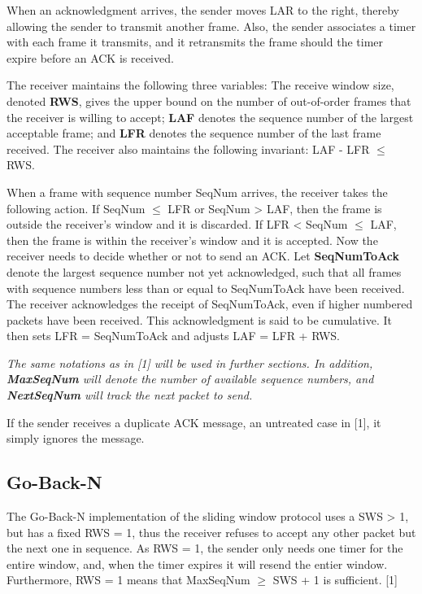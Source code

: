 \documentclass[12pt]{article}
\begin{document}
When an acknowledgment arrives, the sender moves LAR to the right, thereby allowing the sender to transmit another frame. Also, the sender associates a timer with each frame it transmits, and it retransmits the frame should the timer expire before an ACK is received.

The receiver maintains the following three variables: The receive window size, denoted \textbf{RWS}, gives the upper bound on the number of out-of-order frames that the receiver is willing to accept; \textbf{LAF} denotes the sequence number of the largest acceptable frame; and \textbf{LFR} denotes the sequence number of the last frame received. The receiver also maintains the following invariant: LAF - LFR $\leq$ RWS.

When a frame with sequence number SeqNum arrives, the receiver takes the following action. If SeqNum $\leq$ LFR or SeqNum > LAF, then the frame is outside the receiver's window and it is discarded. If LFR < SeqNum $\leq$ LAF, then the frame is within the receiver's window and it is accepted. Now the receiver needs to decide whether or not to send an ACK. Let \textbf{SeqNumToAck} denote the largest sequence number not yet acknowledged, such that all frames with sequence numbers less than or equal to SeqNumToAck have been received. The receiver acknowledges the receipt of SeqNumToAck, even if higher numbered packets have been received. This acknowledgment is said to be cumulative. It then sets LFR = SeqNumToAck and adjusts LAF = LFR + RWS.

\textit{The same notations as in [1] will be used in further sections. In addition, \textbf{MaxSeqNum} will denote the number of available sequence numbers, and \textbf{NextSeqNum} will track the next packet to send.}

If the sender receives a duplicate ACK message, an untreated case in [1],  it simply ignores the message.

\subsection{Go-Back-N}

The Go-Back-N implementation of the sliding window protocol uses a SWS > 1, but has a fixed RWS = 1, thus the receiver refuses to accept any other packet but the next one in sequence. As RWS = 1, the sender only needs one timer for the entire window, and, when the timer expires it will resend the entier window. Furthermore, RWS = 1 means that MaxSeqNum $\geq$ SWS + 1 is sufficient. [1]
\end{document}
